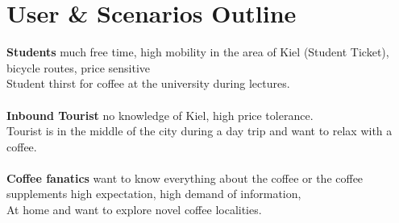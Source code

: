\documentclass{article}
\begin{document}
\section*{User \& Scenarios Outline} 
\textbf{Students} much free time, high mobility in the area of Kiel (Student Ticket), bicycle routes, price sensitive\\
Student thirst for coffee at the university during lectures.\\\\
\textbf{Inbound Tourist} no knowledge of Kiel, high price tolerance. \\
Tourist is in the middle of the city during a day trip and want to relax with a coffee.\\\\
\textbf{Coffee fanatics} want to know everything about the coffee or the coffee supplements high expectation, high demand of information, \\
At home and want to explore novel coffee localities.\\
\end{document}
